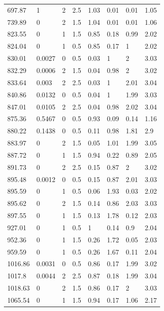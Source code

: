 \begin{longtable}[!h] {p{} p{} p{} p{} p{} p{} p{} p{}}
    697.87  &	1       &	2   &	2.5	 & 	1.03 &	0.01 &	0.01 &	1.05\\
    739.89  &	0       &	2   &	1.5	 & 	1.04 &	0.01 &	0.01 &	1.06\\
    823.55  &	0       &	1   &	1.5	 & 	0.85 &	0.18 &	0.99 &	2.02\\
    824.04  &	0       &	1   &	0.5	 & 	0.85 &	0.17 &	1    &	2.02\\
    830.01  &	0.0027  &	0   &	0.5	 & 	0.03 &	1    &	2    &	3.03\\
    832.29  &	0.0006  &	2   &	1.5	 & 	0.04 &	0.98 &	2    &	3.02\\
    833.64  &	0.003   &	2   &	2.5	 & 	0.03 &	1    &	2.01 &	3.04\\
    840.86  &	0.0132  &	0   &	0.5	 & 	0.04 &	1    &	1.99 &	3.03\\
    847.01  &	0.0105  &	2   &	2.5	 & 	0.04 &	0.98 &	2.02 &	3.04\\
    875.36  &	0.5467  &	0   &	0.5	 & 	0.93 &	0.09 &	0.14 &	1.16\\
    880.22  &	0.1438  &	0   &	0.5	 & 	0.11 &	0.98 &	1.81 &	2.9\\
    883.97  &	0       &	2   &	1.5	 & 	0.05 &	1.01 &	1.99 &	3.05\\
    887.72  &	0       &	1   &	1.5	 & 	0.94 &	0.22 &	0.89 &	2.05\\
    891.73  &	0       &	2   &	2.5	 & 	0.15 &	0.87 &	2    &	3.02\\
    895.48  &	0.0012  &	0   &	0.5	 & 	0.15 &	0.87 &	2.01 &	3.03\\
    895.59  &	0       &	1   &	0.5	 & 	0.06 &	1.93 &	0.03 &	2.02\\
    895.62  &	0       &	2   &	1.5	 & 	0.14 &	0.86 &	2.03 &	3.03\\
    897.55  &	0       &	1   &	1.5	 & 	0.13 &	1.78 &	0.12 &	2.03\\
    927.01  &	0       &	1   &	0.5	 & 	1    &	0.14 &	0.9  &	2.04\\
    952.36  &	0       &	1   &	1.5	 &	0.26 &	1.72 &	0.05 & 	2.03\\
    959.59  &	0       &	1   &	0.5	 &	0.26 &	1.67 &	0.11 &	2.04\\
    1016.86 &	0.0031  &	0   &	0.5	 &	0.86 &	0.17 &	1.99 &	3.02\\
    1017.8  &	0.0044  &	2   &	2.5	 &	0.87 &	0.18 &	1.99 &	3.04\\
    1018.63 &	0       &	2   &	1.5	 &	0.86 &	0.17 &	2    &	3.03\\
    1065.54 &	0       &	1   &	1.5	 &	0.94 &	0.17 &	1.06 &	2.17\\

\end{longtable}
